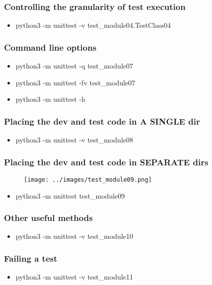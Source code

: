 \documentclass[11pt]{beamer}
\begin{document}
\begin{frame}
\frametitle{Controlling the granularity of test execution}

\begin{itemize}
	\item python3 -m unittest -v test\_module04.TestClass04
\end{itemize}
\end{frame}

\begin{frame}
\frametitle{Command line options}

\begin{itemize}
	\item python3 -m unittest -q test\_module07
	\item python3 -m unittest -fv test\_module07
	\item python3 -m unittest -h
\end{itemize}
\end{frame}

\begin{frame}
\frametitle{Placing the dev and test code in A SINGLE dir}

\begin{itemize}
	\item python3 -m unittest -v test\_module08
\end{itemize}
\end{frame}

\begin{frame}
\frametitle{Placing the dev and test code in SEPARATE dirs}
\begin{figure}[h]
	\centering
	\texttt{[image: ../images/test\_module09.png]}
\end{figure}
\begin{itemize}
	\item python3 -m unittest test\_module09
\end{itemize}
\end{frame}

\begin{frame}
\frametitle{Other useful methods}

\begin{itemize}
	\item python3 -m unittest -v test\_module10
\end{itemize}
\end{frame}

\begin{frame}
\frametitle{Failing a test}

\begin{itemize}
	\item python3 -m unittest -v test\_module11
\end{itemize}
\end{frame}
\end{document}
